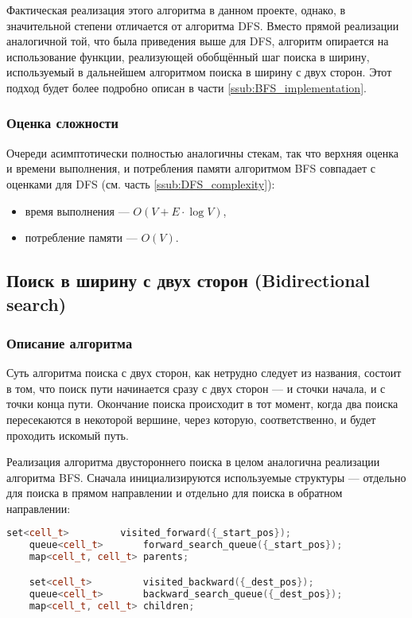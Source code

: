 \documentclass[a4paper, 12pt]{article}
\begin{document}
Фактическая реализация этого алгоритма в данном проекте, однако, в значительной степени отличается от алгоритма DFS. Вместо прямой реализации аналогичной той, что была приведения выше для DFS, алгоритм опирается на использование функции, реализующей обобщённый шаг поиска в ширину, используемый в дальнейшем алгоритмом поиска в ширину с двух сторон. Этот подход будет более подробно описан в части \ref{ssub:BFS_implementation}.

\subsubsection{Оценка сложности}
Очереди асимптотически полностью аналогичны стекам, так что верхняя оценка и времени выполнения, и потребления памяти алгоритмом BFS совпадает с оценками для DFS (см. часть \ref{ssub:DFS_complexity}):
\begin{itemize}
    \item время выполнения --- \({ O(V + E \cdot \log V) }\),
    \item потребление памяти --- \({ O(V) }\).
\end{itemize}

\subsection{Поиск в ширину с двух сторон (Bidirectional search)}
\subsubsection{Описание алгоритма}
\label{ssub:bi_BFS_algorithm}
Суть алгоритма поиска с двух сторон, как нетрудно следует из названия, состоит в том, что поиск пути начинается сразу с двух сторон --- и сточки начала, и с точки конца пути. Окончание поиска происходит в тот момент, когда два поиска пересекаются в некоторой вершине, через которую, соответственно, и будет проходить искомый путь.

Реализация алгоритма двустороннего поиска в целом аналогична реализации алгоритма BFS. Сначала инициализируются используемые структуры --- отдельно для поиска в прямом направлении и отдельно для поиска в обратном направлении:

\begin{lstlisting}[language=C++]
    set<cell_t>         visited_forward({_start_pos});
    queue<cell_t>       forward_search_queue({_start_pos});
    map<cell_t, cell_t> parents;

    set<cell_t>         visited_backward({_dest_pos});
    queue<cell_t>       backward_search_queue({_dest_pos});
    map<cell_t, cell_t> children;
\end{lstlisting}
\end{document}
